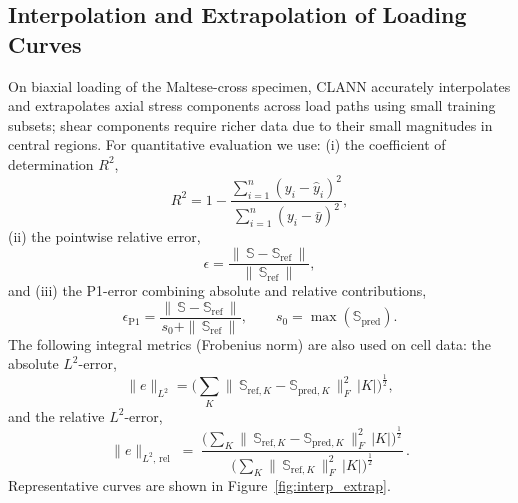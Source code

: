 \documentclass[journal,article,submit,pdftex,moreauthors]{Definitions/mdpi}
\begin{document}


\subsection{Interpolation and Extrapolation of Loading Curves}
On biaxial loading of the Maltese-cross specimen, CLANN accurately interpolates and extrapolates axial stress components across load paths using small training subsets; shear components require richer data due to their small magnitudes in central regions. For quantitative evaluation we use: (i) the coefficient of determination $R^2$,
\begin{equation}\label{eq:r_squared_eng}
  R^2 = 1 - \frac{\sum_{i=1}^n (y_i - \hat{y}_i)^2}{\sum_{i=1}^n (y_i - \bar{y})^2},
\end{equation}
(ii) the pointwise relative error,
\begin{equation}\label{eq:rel_error_eng}
  \epsilon = \frac{\| \, \mathbb S - \mathbb S_{\text{ref}} \, \|}{\| \, \mathbb S_{\text{ref}} \, \|},
\end{equation}
and (iii) the P1-error combining absolute and relative contributions,
\begin{equation}\label{eq:p1_error_eng}
  \epsilon_{\mathrm{P1}} = \frac{\| \, \mathbb S - \mathbb S_{\text{ref}} \, \|}{s_0 + \| \, \mathbb S_{\text{ref}} \, \|},\qquad s_0 = \max(\mathbb S_{\text{pred}}).
\end{equation}
The following integral metrics (Frobenius norm) are also used on cell data: the absolute $L^2$-error,
\begin{equation}\label{eq:l2_abs_stress_cell_eng}
  \|e\|_{L^2} = \Bigg( \sum_{K} \| \, \mathbb S_{\text{ref},K} - \mathbb S_{\text{pred},K} \, \|_F^{2}\, |K| \Bigg)^{\tfrac12},
\end{equation}
and the relative $L^2$-error,
\begin{equation}\label{eq:l2_rel_stress_eng}
  \|e\|_{L^2,\,\mathrm{rel}}\;=\; \frac{\Big( \sum\limits_{K} 
  \| \, \mathbb S_{\mathrm{ref},K} - \mathbb S_{\mathrm{pred},K} \, \|_F^{2}\, |K| \Big)^{\tfrac12}}
  {\Big( \sum\limits_{K} \| \, \mathbb S_{\mathrm{ref},K} \, \|_F^{2}\, |K| \Big)^{\tfrac12}}\,.
\end{equation}
Representative curves are shown in Figure~\ref{fig:interp_extrap}.
\end{document}
